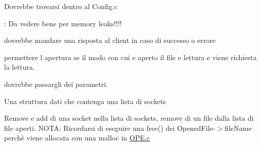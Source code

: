
\begin{DoxyRefList}
\item[\label{todo__todo000005}%
\hypertarget{todo__todo000005}{}%
global\+Scope$>$ Globale \hyperlink{StruttureDati_8c_a2a0d14b97e3ebef118d2d1420c51f429}{alloca\+E\+Inizializza\+Memoria} ()]Dovrebbe trovarsi dentro al Config.\+c  
\item[\label{todo__todo000002}%
\hypertarget{todo__todo000002}{}%
global\+Scope$>$ Globale \hyperlink{OPE_8c_a6eccb6ec6ec9c8375e70ab4088b511a5}{handle\+Open\+Command} (char $\ast$command, int socket)]\+: Da vedere bene per memory leaks!!!!  
\item[\label{todo__todo000001}%
\hypertarget{todo__todo000001}{}%
File \hyperlink{OPE_8c}{O\+P\+E.c} ]dovrebbe mandare una risposta al client in caso di successo o errore 

permettere l\textquotesingle{} apertura se il modo con cui e\textquotesingle{} aperto il file e\textquotesingle{} lettura e viene richiesta la lettura.  
\item[\label{todo__todo000003}%
\hypertarget{todo__todo000003}{}%
global\+Scope$>$ Globale \hyperlink{server_8c_a5e7b14672f9e2c9fa99b363004afb8e8}{spawn\+Thread} ()]dovrebbe passargli dei parametri.  
\item[\label{todo__todo000004}%
\hypertarget{todo__todo000004}{}%
File \hyperlink{StruttureDati_8c}{Strutture\+Dati.c} ]Una struttura dati che contenga una lista di sockets 

Remove e add di una socket nella lista di sockets, remove di un file dalla lista di file aperti. N\+O\+T\+A\+: Ricordarsi di eseguire una free() dei Opened\+File-\/$>$file\+Name perchè viene allocata con una malloc in \hyperlink{OPE_8c}{O\+P\+E.\+c}
\end{DoxyRefList}